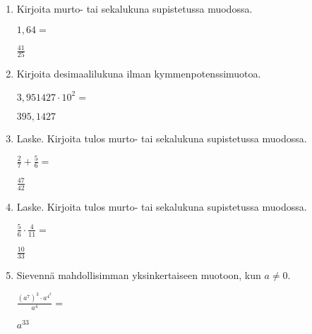 \documentclass[finnish, a4paper, 12pt]{article}
\begin{document}
	\begin{enumerate}[leftmargin=*]
		\setlength\itemsep{1em}
		
		\item %
		Kirjoita murto- tai sekalukuna supistetussa muodossa. 
		
		\(
		1{,}64 = 
		\) %
		
		\begin{version:withAnswers}
		\( \frac{41}{25} \)
		\end{version:withAnswers}

		\vspace{8pt}
		
		\item %
		Kirjoita desimaalilukuna ilman kymmenpotenssimuotoa. 
		
		\(
		3{,}951427\cdot 10^{2} = 
		\) %
		\begin{version:withAnswers}
		\( 395,1427 \)
		\end{version:withAnswers}	
		\vspace{8pt}
		
		\item %
		Laske. Kirjoita tulos murto- tai sekalukuna supistetussa muodossa.
		
		\(
		\displaystyle
		\frac{2}{7}+\frac{5}{6} = 
		\) %
		\begin{version:withAnswers}
		\( \frac{47}{42} \)
		\end{version:withAnswers}	
		
		\vspace{8pt}
		
		\item %
		Laske. Kirjoita tulos murto- tai sekalukuna supistetussa muodossa.
		
		\(
		\displaystyle
		\frac{5}{6}\cdot\frac{4}{11} = 
		\) %
		\begin{version:withAnswers}
		\( \frac{10}{33} \)
		\end{version:withAnswers}
		
		\vspace{8pt}
		
		\item %
		Sievennä mahdollisimman yksinkertaiseen muotoon, kun \(a \not = 0\). 
		
		\(
		\displaystyle
		\frac{\left(a^7\right)^3 \cdot a^{4^2}}{a^4} =
		\phantom{mmmmmmmmmmmmmmm}
		\) %
		\begin{version:withAnswers}
		\(  a^{33} \)
		\end{version:withAnswers}
		

\end{enumerate}
\end{document}
